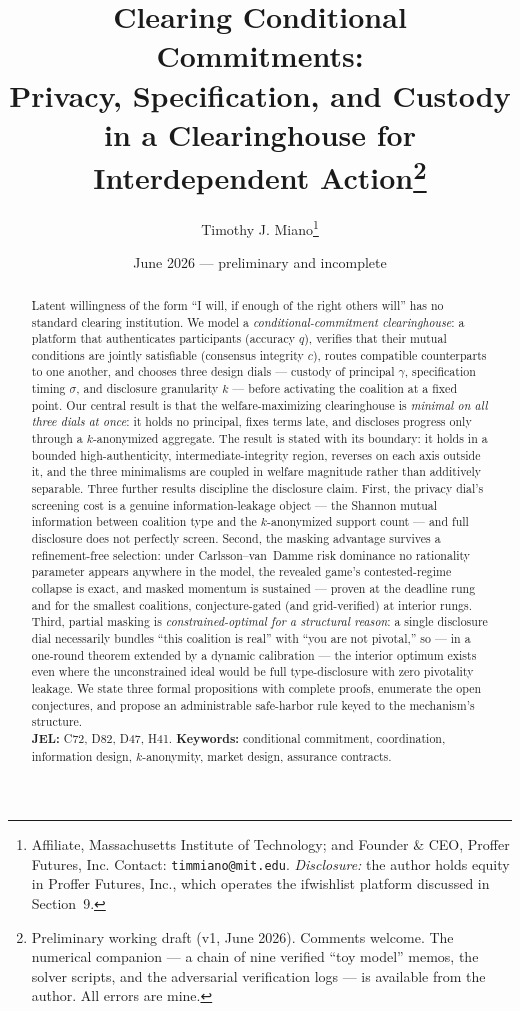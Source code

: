 \documentclass[11pt]{article}
\title{Clearing Conditional Commitments:\\
\large Privacy, Specification, and Custody in a Clearinghouse for Interdependent Action\thanks{%
Preliminary working draft (v1, June 2026). Comments welcome. The numerical companion --- a
chain of nine verified ``toy model'' memos, the solver scripts, and the adversarial
verification logs --- is available from the author. All errors are mine.}}
\author{Timothy J. Miano\thanks{Affiliate, Massachusetts Institute of Technology; and Founder \& CEO, Proffer Futures, Inc. Contact: \texttt{timmiano@mit.edu}. \emph{Disclosure:} the author holds equity in Proffer Futures, Inc., which operates the ifwishlist platform discussed in Section~9.}}
\date{June 2026 --- preliminary and incomplete}
\theoremstyle{definition}
\theoremstyle{remark}
\begin{document}
\maketitle

\begin{abstract}
\noindent
Latent willingness of the form ``I will, if enough of the right others will'' has no
standard clearing institution. We model a \emph{conditional-commitment clearinghouse}: a platform
that authenticates participants (accuracy $q$), verifies that their mutual conditions are
jointly satisfiable (consensus integrity $c$), routes compatible counterparts to one another,
and chooses three design dials --- custody of principal $\gamma$, specification timing
$\sigma$, and disclosure granularity $k$ --- before activating the coalition at a fixed
point. Our central result is that the welfare-maximizing clearinghouse is \emph{minimal on
all three dials at once}: it holds no principal, fixes terms late, and discloses progress
only through a $k$-anonymized aggregate. The result is stated with its boundary: it holds in
a bounded high-authenticity, intermediate-integrity region, reverses on each axis outside
it, and the three minimalisms are coupled in welfare magnitude rather than additively
separable. Three further results discipline the disclosure claim. First, the privacy dial's
screening cost is a genuine information-leakage object --- the Shannon mutual information
between coalition type and the $k$-anonymized support count --- and full disclosure does not
perfectly screen. Second, the masking advantage survives a refinement-free selection: under
Carlsson--van~Damme risk dominance no rationality parameter appears anywhere in the
model, the revealed game's contested-regime collapse is exact, and masked momentum is
sustained --- proven at the deadline rung and for the smallest coalitions, conjecture-gated
(and grid-verified) at interior rungs. Third, partial
masking is \emph{constrained-optimal for a structural reason}: a single disclosure dial
necessarily bundles ``this coalition is real'' with ``you are not pivotal,'' so --- in a
one-round theorem extended by a dynamic calibration --- the interior optimum exists even
where the unconstrained ideal would be full type-disclosure with zero pivotality leakage. We state three formal propositions with complete proofs, enumerate the
open conjectures, and propose an administrable safe-harbor rule keyed to the mechanism's
structure.\\[4pt]
\textbf{JEL:} C72, D82, D47, H41.\quad
\textbf{Keywords:} conditional commitment, coordination, information design, $k$-anonymity,
market design, assurance contracts.
\end{abstract}
\end{document}
